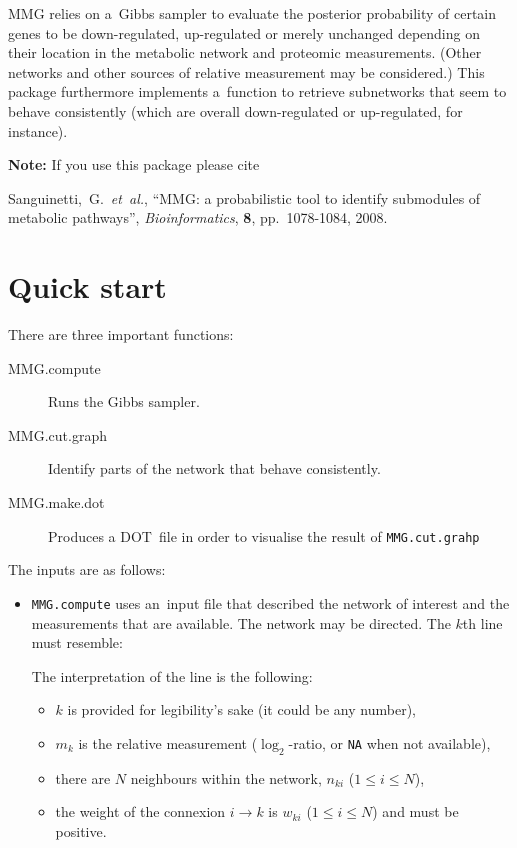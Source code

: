 \documentclass[a4paper]{article}
\newcommand*{\code}[1]{\texttt{#1}}
\begin{document}
\medbreak

MMG relies on a~Gibbs sampler to evaluate the posterior probability of certain genes to be down-regulated, up-regulated or merely unchanged depending on their location in the metabolic network and proteomic measurements.  (Other networks and other sources of relative measurement may be considered.)  This package furthermore implements a~function to retrieve subnetworks that seem to behave consistently (which are overall down-regulated or up-regulated, for instance).

\bigbreak

\noindent \textbf{Note:} If you use this package please cite
%
\begin{list}{}{}
\item
  Sanguinetti,~G.\ \emph{et~al.},
  ``MMG: a probabilistic tool to identify submodules of metabolic pathways'',
  \emph{Bioinformatics}, \textbf{8}, pp.~1078-1084, 2008.
\end{list}

\section{Quick start}

There are three important functions:
%
\begin{description}
\item[MMG.compute]   Runs the Gibbs sampler.
\item[MMG.cut.graph] Identify parts of the network that behave consistently.
\item[MMG.make.dot]  Produces a DOT~file in order to visualise the result of \code{MMG.cut.grahp}
\end{description}

The inputs are as follows:
%
\begin{itemize}
\item \code{MMG.compute} uses an~input file that described the network of interest and the measurements that are available.  The network may be directed.  The $k$th line must resemble:
%

The interpretation of the line is the following:
%
\begin{itemize}
\item $k$ is provided for legibility's sake (it could be any number),
\item $m_k$ is the relative measurement ($\log_2$-ratio, or \code{NA} when not available),
\item there are $N$ neighbours within the network, $n_{ki}$ ($1 \leq i\leq N$),
\item the weight of the connexion $i \to k$ is $w_{ki}$ ($1 \leq i\leq N$) and must be positive.
\end{itemize}
\end{itemize}
\end{document}
